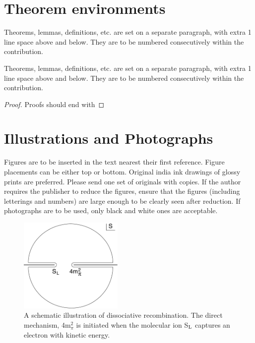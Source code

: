 \documentclass{ws-ijprai}
\begin{document}
\section{Theorem environments}

\begin{theorem}\label{thm1}
Theorems, lemmas, definitions, etc. are set on a separate paragraph,
with extra 1 line space above and below. They are to be numbered
consecutively within the contribution.
\end{theorem}

\begin{lemma}\label{lem1}
Theorems, lemmas, definitions, etc. are set on a separate paragraph,
with extra 1 line space above and below. They are to be numbered
consecutively within the contribution.
\end{lemma}

\begin{proof}
Proofs should end with
\end{proof}

\section{Illustrations and Photographs}

Figures are to be inserted in the text nearest their first reference.
Figure placements can be either top or bottom.  Original india ink
drawings of glossy prints are preferred. Please send one set of
originals with copies. If the author requires the publisher to reduce
the figures, ensure that the figures (including letterings and
numbers) are large enough to be clearly seen after reduction. If
photographs are to be used, only black and white ones are acceptable.

\begin{figure}[bh]
\centerline{\includegraphics[width=5cm]{ijpraif1}}
\vspace*{8pt}
\caption{A schematic illustration of dissociative recombination. The
direct mechanism, 4m$^2_\pi$ is initiated when the
molecular ion S$_{\rm L}$ captures an electron with kinetic energy.}
\end{figure}
\end{document}
